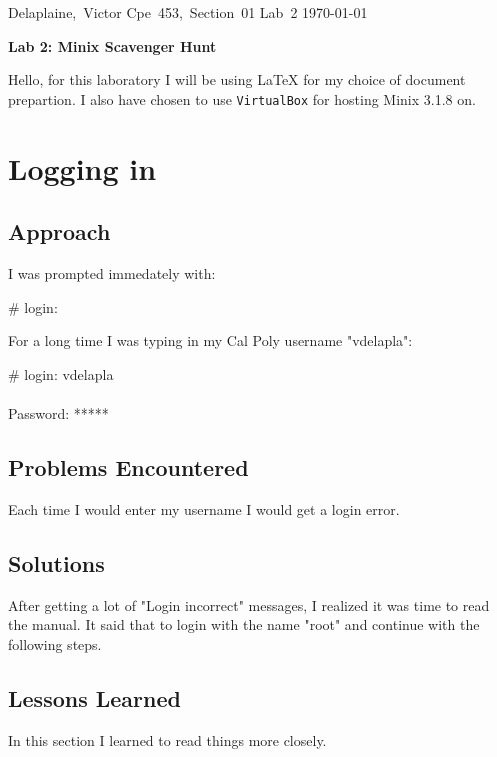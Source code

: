 \documentclass[11pt]{article}
\begin{document}
\hfill\vbox{\hbox{Delaplaine, Victor}
		\hbox{Cpe 453, Section 01}	
		\hbox{Lab 2}	
		\hbox{\today}}\par

\bigskip
\centerline{\Large\bf Lab 2: Minix Scavenger Hunt}\par
\bigskip 

Hello, for this laboratory I will be using {\LaTeX} for my choice of document prepartion. 
I also have chosen to use {\tt VirtualBox} for hosting Minix 3.1.8 on.

\setcounter{section}{1} %
\section{Logging in}


\subsection{Approach}

I was prompted immedately with:

{\tt\begin{tabbing}
\# login: \\
\end{tabbing}}

For a long time I was typing in my Cal Poly username "vdelapla":

{\tt\begin{tabbing}
\# login: vdelapla\\
\\ Password: *****\\
\end{tabbing}}


\subsection{Problems Encountered}
  Each time I would enter my username I would get a login error.

\subsection{Solutions}
  After getting a lot of "Login incorrect" messages, I realized it was time to 
read the manual. It said that to login with the name "root" and continue with 
the following steps.


\subsection{Lessons Learned}
  In this section I learned to read things more closely.
\end{document}
